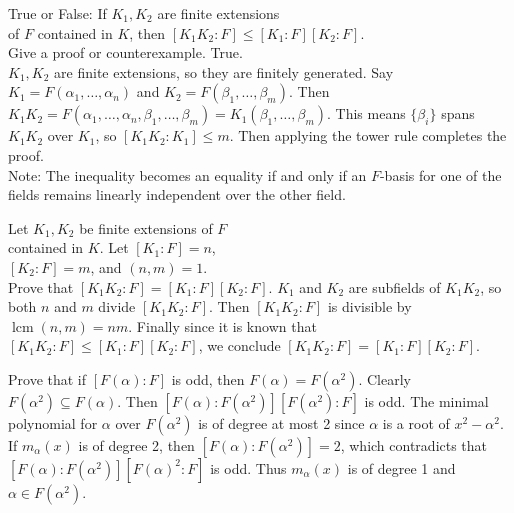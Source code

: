\documentclass[avery5371,grid]{flashcards}
\DeclareMathOperator{\lcm}{lcm}
\begin{document}
\begin{flashcard}[Fields]{True or False: If $K_1, K_2$ are finite extensions \\of $F$ contained in $K$, then $[K_1K_2:F]\leq[K_1:F][K_2:F]$. \\Give a proof or counterexample.}
 True. \\
 
 $K_1,K_2$ are finite extensions, so they are finitely generated. Say $K_1 = F(\alpha_1, \ldots, \alpha_n)$ and $K_2 = F(\beta_1, \ldots, \beta_m)$. Then $K_1K_2 = F(\alpha_1, \ldots, \alpha_n, \beta_1, \ldots, \beta_m) = K_1(\beta_1, \ldots, \beta_m)$. This means $\{\beta_i\}$ spans $K_1K_2$ over $K_1$, so $[K_1K_2:K_1] \leq m$. Then applying the tower rule completes the proof.\\
 
 Note: The inequality becomes an equality if and only if an $F$-basis for one of the fields remains linearly independent over the other field.
\end{flashcard}

\begin{flashcard}[Fields]{Let $K_1, K_2$ be finite extensions of $F$ \\contained in $K$. Let $[K_1: F] = n$, \\$[K_2:F]=m$, and $(n,m)=1$. \\Prove that $[K_1K_2:F] = [K_1:F][K_2:F]$.}
 $K_1$ and $K_2$ are subfields of $K_1K_2$, so both $n$ and $m$ divide $[K_1K_2: F]$. Then $[K_1K_2:F]$ is divisible by $\lcm(n,m) = nm$. Finally since it is known that $[K_1K_2:F]\leq[K_1:F][K_2:F]$, we conclude $[K_1K_2:F]=[K_1:F][K_2:F]$.
\end{flashcard}

\begin{flashcard}[Fields]{Prove that if $[F(\alpha):F]$ is odd, then $F(\alpha) = F(\alpha^2)$.}
 Clearly $F(\alpha^2) \subseteq F(\alpha)$. Then $[F(\alpha):F(\alpha^2)][F(\alpha^2):F]$ is odd. The minimal polynomial for $\alpha$ over $F(\alpha^2)$ is of degree at most 2 since $\alpha$ is a root of $x^2 - \alpha^2$.\\
 
 If $m_{\alpha}(x)$ is of degree 2, then $[F(\alpha):F(\alpha^2)] = 2$, which contradicts that $[F(\alpha):F(\alpha^2)][F(\alpha)^2:F]$ is odd. Thus $m_{\alpha}(x)$ is of degree 1 and $\alpha \in F(\alpha^2)$.
\end{flashcard}
\end{document}
